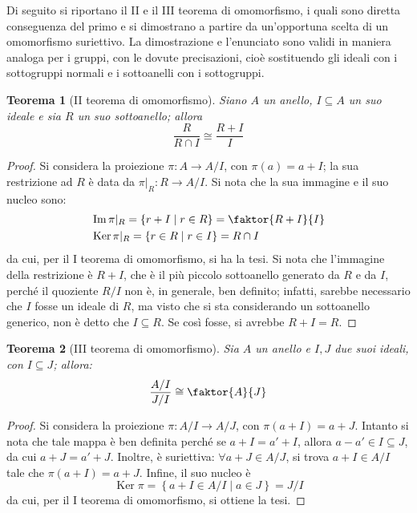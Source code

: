 \documentclass[12pt]{scrartcl}
\theoremstyle{style}
\newtheorem{teorema}{Teorema}[section]
\numberwithin{equation}{subsection}
\begin{document}
\noindent Di seguito si riportano il II e il III teorema di omomorfismo, i quali sono diretta conseguenza del primo e si dimostrano a partire da un'opportuna scelta di un omomorfismo suriettivo.
La dimostrazione e l'enunciato sono validi in maniera analoga per i gruppi, con le dovute precisazioni, cio\`e sostituendo gli ideali con i sottogruppi normali e i sottoanelli con i sottogruppi.
\begin{teorema}
	[II teorema di omomorfismo]
	Siano $A$ un anello, $I\subseteq A$ un suo ideale e sia $R$ un suo sottoanello; allora 
	\[
	 \frac{R}{R\cap I}\cong\frac{R+I}{I}
	\] 
\end{teorema}
	\begin{proof}
		Si considera la proiezione $\pi : A \to A / I$, con $\pi(a) = a + I$; la sua restrizione ad $R$ \`e data da $\pi|_R : R \to A / I$.
		Si nota che la sua immagine e il suo nucleo sono: 
		\[
			\begin{split}
				&\operatorname{Im} \pi|_R = \left\{ r + I  \mid r \in R \right\} = \faktor{R+I}{I}\\
				&\operatorname{Ker} \pi|_R = \left\{ r \in R  \mid r \in I \right\}  = R \cap I 
			\end{split}
		\] 
		da cui, per il I teorema di omomorfismo, si ha la tesi.
		Si nota che l'immagine della restrizione \`e $R+I$, che \`e il pi\`u piccolo sottoanello generato da $R$ e da $I$, perch\'e il quoziente $R / I$ non \`e, in generale, ben definito; infatti, sarebbe necessario che $I$ fosse un ideale di $R$, ma visto che si sta considerando un sottoanello generico, non \`e detto che $I \subseteq R$. 
		Se cos\`i fosse, si avrebbe $R + I = R$.
	\end{proof}
\begin{teorema}
	[III teorema di omomorfismo]
	Sia $A $ un anello e $I,J$ due suoi ideali, con $I \subseteq J$; allora:
	\[
		\frac{A / I }{J / I}\cong \faktor{A}{J}
	\] 
\end{teorema}
	\begin{proof}
		Si considera la proiezione $\pi : A / I \to A / J$, con $\pi(a+ I) = a + J $.
	Intanto si nota che tale mappa \`e ben definita perch\'e se $a + I = a' + I$, allora $a-a' \in I \subseteq J$, da cui $a + J = a'+ J$.
Inoltre, \`e suriettiva: $\forall a + J \in A / J$, si trova $a +I \in A / I$ tale che $\pi(a+I) = a + J$.
Infine, il suo nucleo \`e 
\[
\operatorname{Ker} \pi = \left\{ a+ I \in A / I  \mid a \in J \right\} = J / I
\] 
da cui, per il I teorema di omomorfismo, si ottiene la tesi.
	\end{proof}
\end{document}
